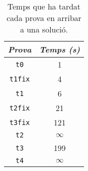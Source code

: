 \documentclass{article}
\begin{document}
\begin{table}[ht]
	\centering
	\begin{tabular}{|c|c|}
		\hline
		\emph{Prova} & \emph{Temps (s)} \\
		\hline
		\texttt{t0} & 1 \\
		\texttt{t1fix} & 4 \\
		\texttt{t1} & 6 \\
		\texttt{t2fix} & 21 \\
		\texttt{t3fix} & 121 \\
		\texttt{t2} & $\infty$ \\
		\texttt{t3} & 199 \\
		\texttt{t4} & $\infty$ \\
		\hline
	\end{tabular}
	\caption{Temps que ha tardat cada prova en arribar a una solució.}
	\label{tab:performance}
\end{table}
\end{document}
